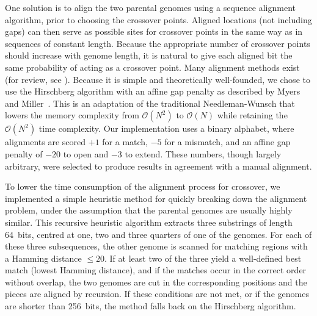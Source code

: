 \documentclass[10pt]{article}
\newcommand{\ordo}{\mathcal{O}}
\renewcommand{\paragraph}[1]{\textbf{#1}\hspace{2ex}}
\renewcommand{\paragraph}[1]{}
\begin{document}
\paragraph{Hirschberg} One solution is to align the two parental genomes
using a sequence alignment algorithm, prior to choosing the crossover points.
Aligned locations (not including gaps) can then serve as possible sites for crossover
points in the same way as in sequences of constant length. Because the
appropriate number of crossover points should increase with genome length,
it is natural to give each aligned bit the same probability of acting as a
crossover point. Many alignment methods exist (for review, see \cite{haque2009}).
Because it is simple and theoretically well-founded, we chose to use the Hirschberg
algorithm with an affine gap penalty as described by Myers and
Miller~\cite{hirschberg1975,myers1988}. This is an adaptation of the traditional Needleman-Wunsch that lowers
the memory complexity from $\ordo{}(N^2)$ to $\ordo{}(N)$ while retaining the
$\ordo{}(N^2)$ time complexity. Our implementation
uses a binary alphabet, where alignments are scored $+1$ for a match, $-5$
for a mismatch, and an affine gap penalty of $-20$ to open and $-3$ to
extend. These numbers, though largely arbitrary, were selected to produce
results in agreement with a manual alignment.

\paragraph{Heuristic} To lower the time consumption of the alignment process
for crossover, we implemented a simple heuristic method for quickly breaking down the
alignment problem, under the assumption that the parental genomes are usually
highly similar. This recursive heuristic algorithm extracts three substrings of
length 64~bits, centred at one, two and three quarters of one of the genomes. For each
of these three subsequences, the other genome is scanned for matching regions with
a Hamming distance $\le 20$. If at least two of the three yield a well-defined
best match (lowest Hamming distance), and if
the matches occur in the correct order without overlap, the two genomes are
cut in the corresponding positions and the pieces are aligned by recursion. If
these conditions are not met, or if the genomes are shorter than 256~bits, the
method falls back on the Hirschberg algorithm.
\end{document}
